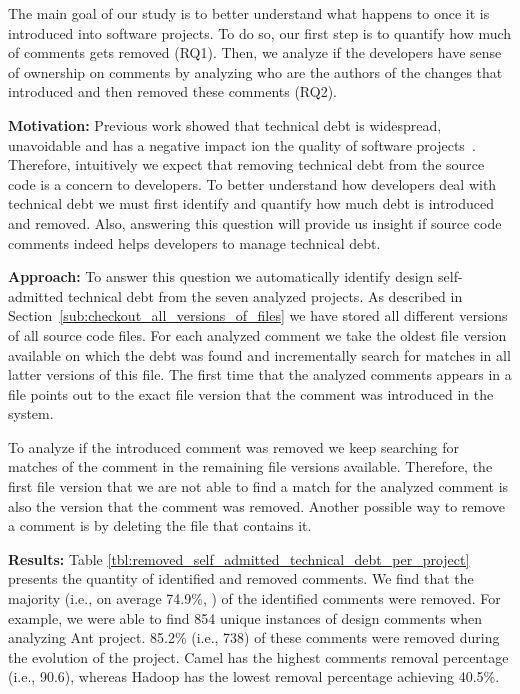 The main goal of our study is to better understand what happens to \SATD once it is introduced into software projects. To do so, our first step is to quantify how much of \SATD comments gets removed (RQ1). Then, we analyze if the developers have sense of ownership on \SATD comments by analyzing who are the authors of the changes that introduced and then removed these \SATD comments (RQ2). 

\vspace{3mm}
\noindent\rqi
\vspace{3mm}

\noindent \textbf{Motivation:} Previous work showed that technical debt is widespread, unavoidable and has a negative impact ion the quality of software projects~\cite{Lim2012Software}. Therefore, intuitively we expect that removing technical debt from the source code is a concern to developers. To better understand how developers deal with technical debt we must first identify and quantify how much debt is introduced and removed. Also, answering this question will provide us insight if source code comments indeed helps developers to manage technical debt. 

\vspace{1mm}
\noindent \textbf{Approach:} To answer this question we automatically identify design self-admitted technical debt from the seven analyzed projects. As described in Section~\ref{sub:checkout_all_versions_of_files} we have stored all different versions of all source code files. For each analyzed \SATD comment we take the oldest file version available on which the debt was found and incrementally search for matches in all latter versions of this file. The first time that the analyzed \SATD comments appears in a file points out to the exact file version that the \SATD comment was introduced in the system.

To analyze if the introduced \SATD comment was removed we keep searching for matches of the comment in the remaining file versions available. Therefore, the first file version that we are not able to find a match for the analyzed comment is also the version that the \SATD comment was removed. Another possible way to remove a \SATD comment is by deleting the file that contains it. 

\vspace{1mm}
\noindent \textbf{Results:} Table \ref{tbl:removed_self_admitted_technical_debt_per_project} presents the quantity of identified and removed \SATD comments. We find that the majority (i.e., on average 74.9\%, ) of the identified \SATD comments were removed. For example, we were able to find 854 unique instances of design \SATD comments when analyzing Ant project. 85.2\% (i.e., 738) of these \SATD comments were removed during the evolution of the project. Camel has the highest \SATD comments removal percentage (i.e., 90.6), whereas Hadoop has the lowest removal percentage achieving 40.5\%.

